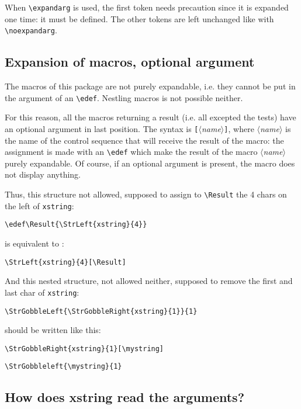 \documentclass[a4paper,10pt]{article}
\newcommand\argu[1]{$\langle$\textit{#1}$\rangle$}
\newcommand\arguC[1]{\texttt{[}\argu{#1}\texttt{]}}
\newcommand\Xstring{\textsf{xstring}\xspace}
\newcommand\verbinline{\lstinline[basicstyle=\normalsize\ttfamily]}
\begin{document}
When \verbinline|\expandarg| is used, the first token needs precaution since it is expanded one time: it must be defined. The other tokens are left unchanged like with \verbinline|\noexpandarg|.

\subsection{Expansion of macros, optional argument}
\label{argumentoptionnel}
The macros of this package are not purely expandable, i.e. they cannot be put in the argument of an \verbinline|\edef|. Nestling macros is not possible neither.\medskip

For this reason, all the macros returning a result (i.e. all excepted the tests) have an optional argument in last position. The syntax is \arguC{name}, where \argu{name} is the name of the control sequence that will receive the result of the macro: the assignment is made with an \verbinline|\edef| which make the result of the macro \argu{name} purely expandable. Of course, if an optional argument is present, the macro does not display anything.\medskip

Thus, this structure not allowed, supposed to assign to \verb|\Result| the 4 chars on the left of \verb|xstring|:\par\nobreak
\hspace{0.2\linewidth}\verbinline|\edef\Result{\StrLeft{xstring}{4}}|\par\nobreak
\qquad is equivalent to :\par\nobreak
\hspace{0.2\linewidth}\verbinline|\StrLeft{xstring}{4}[\Result]|\medskip

And this nested structure, not allowed neither, supposed to remove the first and last char of \verb|xstring|:\par\nobreak
\hspace{0.2\linewidth}\verbinline|\StrGobbleLeft{\StrGobbleRight{xstring}{1}}{1}|\par\nobreak
\qquad should be written like this:\par\nobreak
\hspace{0.2\linewidth}\verbinline|\StrGobbleRight{xstring}{1}[\mystring]|\par\nobreak
\hspace{0.2\linewidth}\verbinline|\StrGobbleleft{\mystring}{1}|\par

\subsection{How does \Xstring read the arguments?}
\label{developpementarguments}
\end{document}
